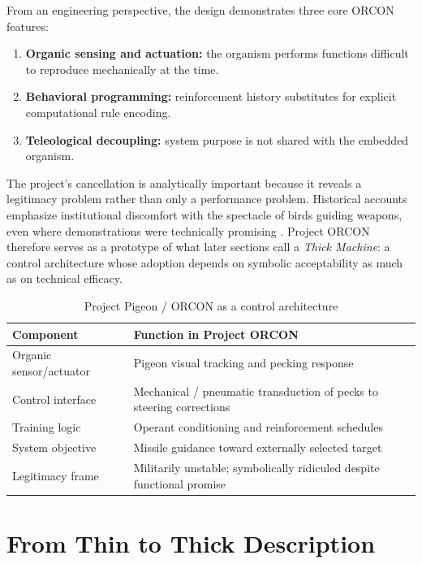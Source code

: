 \documentclass[11pt, a4paper]{article}
\begin{document}
From an engineering perspective, the design demonstrates three core ORCON features:

\begin{enumerate}[leftmargin=1.5em]
    \item \textbf{Organic sensing and actuation:} the organism performs functions difficult to reproduce mechanically at the time.
    \item \textbf{Behavioral programming:} reinforcement history substitutes for explicit computational rule encoding.
    \item \textbf{Teleological decoupling:} system purpose is not shared with the embedded organism.
\end{enumerate}

The project's cancellation is analytically important because it reveals a legitimacy problem rather than only a performance problem. Historical accounts emphasize institutional discomfort with the spectacle of birds guiding weapons, even where demonstrations were technically promising \cite{capshew1993engineering,wlodarczyk2020beyond}. Project ORCON therefore serves as a prototype of what later sections call a \emph{Thick Machine}: a control architecture whose adoption depends on symbolic acceptability as much as on technical efficacy.

\begin{table}[h]
\centering
\caption{Project Pigeon / ORCON as a control architecture}
\begin{tabular}{p{}p{}}
\toprule
\textbf{Component} & \textbf{Function in Project ORCON} \\
\midrule
Organic sensor/actuator & Pigeon visual tracking and pecking response \\
Control interface & Mechanical / pneumatic transduction of pecks to steering corrections \\
Training logic & Operant conditioning and reinforcement schedules \\
System objective & Missile guidance toward externally selected target \\
Legitimacy frame & Militarily unstable; symbolically ridiculed despite functional promise \\
\bottomrule
\end{tabular}
\end{table}

\section{From Thin to Thick Description}
\end{document}
